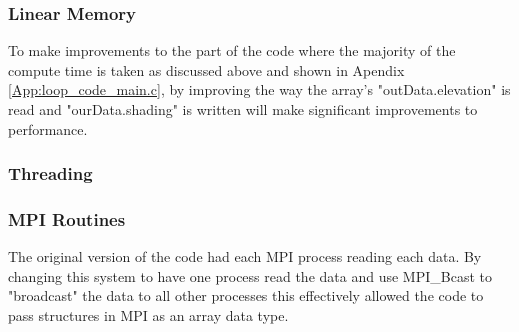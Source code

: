 \documentclass[]{article}%
\begin{document}
\subsubsection{Linear Memory}

To make improvements to the part of the code where the majority of the compute time is taken as discussed above and shown in Apendix \ref{App:loop_code_main.c}, by improving the way the array's "outData.elevation" is read and "ourData.shading" is written will make significant improvements to performance. 

%
%									
%									
%									
%									
%									
%									

\subsubsection{Threading}


\subsubsection{MPI Routines}

The original version of the code had each MPI process reading each data. By changing this system to have one process read the data and use MPI\_Bcast to "broadcast" the data to all other processes this effectively allowed the code to pass structures in MPI as an array data type.
\end{document}
